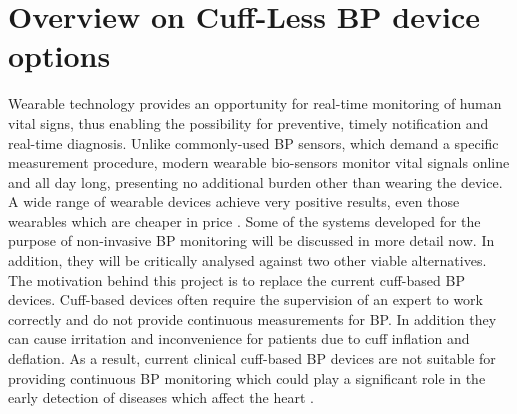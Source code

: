 \documentclass[11pt, a4paper]{article}
\begin{document}
\section{Overview on Cuff-Less BP device options} Wearable technology provides an opportunity for real-time monitoring of human vital signs, thus enabling the possibility for preventive, timely notification and real-time diagnosis. Unlike commonly-used BP sensors, which demand a specific measurement procedure, modern wearable bio-sensors monitor vital signals online and all day long, presenting no additional burden other than wearing the device.  A wide range of wearable devices achieve very positive results, even those wearables which are cheaper in price \cite{Simjanoska20182}. Some of the systems developed for the purpose of non-invasive BP monitoring will be discussed in more detail now. In addition, they will be critically analysed against two other viable alternatives. \\ \newline \noindent The motivation behind this project is to replace the current cuff-based BP devices. Cuff-based devices often require the supervision of an expert to work correctly and do not provide continuous measurements for BP. In addition they can cause irritation and inconvenience for patients due to cuff inflation and deflation. As a result, current clinical cuff-based BP devices are not suitable for providing continuous BP monitoring which could play a significant role in the early detection of diseases which affect the heart \cite{ElHajj2020}.
\end{document}

